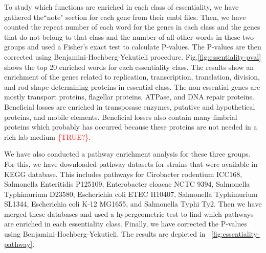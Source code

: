 \documentclass[12pt,letterpaper]{article}
\begin{document}
To study which functions are enriched in each class of essentiality, we have gathered the``note" section for each gene from their embl files. Then, we have counted the repeat number of each word for the genes in each class and the genes that do not belong to that class and the number of all other words in these two groups and used a Fisher's exact test to calculate P-values. The P-values are then corrected using Benjamini-Hochberg-Yekutieli procedure. Fig.\@ \ref{fig:essentiality-pval} shows the top 20 enriched words for each essentiality class. The results show an enrichment of the genes related to replication, transcription, translation, division, and rod shape determining proteins in essential class. The non-essential genes are mostly transport proteins, flagellar proteins, ATPase, and DNA repair proteins. Beneficial losses are enriched in transposase enzymes, putative and hypothetical proteins, and mobile elements. Beneficial losses also contain many fimbrial proteins which probably has occurred because these proteins are not needed in a rich lab medium \textcolor{red}{\{TRUE?\}}.

We have also conducted a pathway enrichment analysis for these three groups. For this, we have downloaded pathway datasets for strains that were available in KEGG database. This includes pathways for Cirobacter rodentium ICC168, Salmonella Enteritidis P125109, Enterobacter cloacae NCTC 9394, Salmonella Typhimurium D23580, Escherichia coli ETEC H10407, Salmonella Typhimurium SL1344, Escherichia coli K-12 MG1655, and Salmonella Typhi Ty2. Then we have merged these databases and used a hypergeometric test to find which pathways are enriched in each essentiality class. Finally, we have corrected the P-values using Benjamini-Hochberg-Yekutieli. The results are depicted in ~\ref{fig:essentiality-pathway}.
\end{document}
